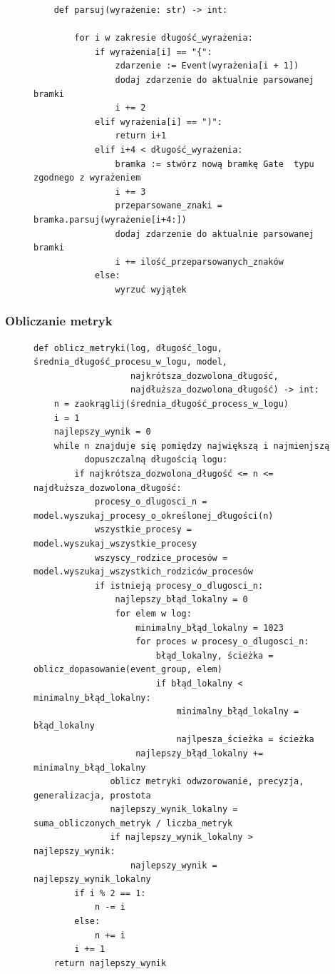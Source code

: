 \begin{figure}[!ht]
\lstset{caption=Parser gramatyki, captionpos=b}
\lstset{label=src:passive, frame=single}
\begin{lstlisting}
    def parsuj(wyrażenie: str) -> int:

        for i w zakresie długość_wyrażenia:
            if wyrażenia[i] == "{":
                zdarzenie := Event(wyrażenia[i + 1])
                dodaj zdarzenie do aktualnie parsowanej bramki 
                i += 2
            elif wyrażenia[i] == ")":
                return i+1
            elif i+4 < długość_wyrażenia:
                bramka := stwórz nową bramkę Gate  typu zgodnego z wyrażeniem 
                i += 3
                przeparsowane_znaki = bramka.parsuj(wyrażenie[i+4:])
                dodaj zdarzenie do aktualnie parsowanej bramki 
                i += ilość_przeparsowanych_znaków
            else:
                wyrzuć wyjątek
\end{lstlisting}
\end{figure}

\subsubsection{Obliczanie metryk}

\begin{figure}[!ht]
\lstset{caption=Obliczanie metryk, captionpos=b}
\lstset{label=src:best_result, frame=single}
\begin{lstlisting}
def oblicz_metryki(log, długość_logu, średnia_długość_procesu_w_logu, model, 
				   najkrótsza_dozwolona_długość, 
				   najdłuższa_dozwolona_długość) -> int:
    n = zaokrąglij(średnia_długość_process_w_logu)
    i = 1
    najlepszy_wynik = 0
    while n znajduje się pomiędzy największą i najmienjszą 
    	  dopuszczalną długością logu:
        if najkrótsza_dozwolona_długość <= n <= najdłuższa_dozwolona_długość:
            procesy_o_dlugosci_n = model.wyszukaj_procesy_o_określonej_długości(n)
            wszystkie_procesy = model.wyszukaj_wszystkie_procesy
            wszyscy_rodzice_procesów = model.wyszukaj_wszystkich_rodziców_procesów
            if istnieją procesy_o_dlugosci_n:
                najlepszy_błąd_lokalny = 0
                for elem w log:
                    minimalny_błąd_lokalny = 1023
                    for proces w procesy_o_dlugosci_n:
                        błąd_lokalny, ścieżka = oblicz_dopasowanie(event_group, elem)
                        if błąd_lokalny < minimalny_błąd_lokalny:
                            minimalny_błąd_lokalny = błąd_lokalny
                            najlpesza_ścieżka = ścieżka
                    najlepszy_błąd_lokalny += minimalny_błąd_lokalny
               oblicz metryki odwzorowanie, precyzja, generalizacja, prostota 
               najlepszy_wynik_lokalny = suma_obliczonych_metryk / liczba_metryk
               if najlepszy_wynik_lokalny > najlepszy_wynik:
                   najlepszy_wynik = najlepszy_wynik_lokalny
        if i % 2 == 1:
            n -= i
        else:
            n += i
        i += 1
    return najlepszy_wynik
\end{lstlisting}
\end{figure}

